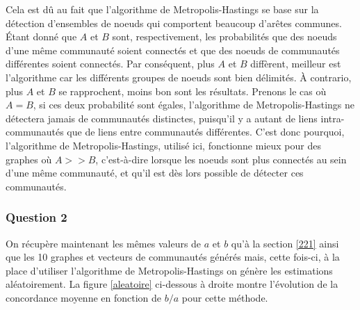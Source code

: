 \documentclass[a4paper, 11pt]{article}
\begin{document}
Cela est dû au fait que l'algorithme de Metropolis-Hastings se base sur la détection d'ensembles de noeuds qui comportent beaucoup d'arêtes communes. Étant donné que $A$ et $B$ sont, respectivement, les probabilités que des noeuds d'une même communauté soient connectés et que des noeuds de communautés différentes soient connectés. Par conséquent, plus $A$ et $B$ diffèrent, meilleur est l'algorithme car les différents groupes de noeuds sont bien délimités. À contrario, plus $A$ et $B$ se rapprochent, moins bon sont les résultats. Prenons le cas où $A=B$, si ces deux probabilité sont égales, l'algorithme de Metropolis-Hastings ne détectera jamais de communautés distinctes, puisqu'il y a autant de liens intra-communautés que de liens entre communautés différentes. C'est donc pourquoi, l'algorithme de Metropolis-Hastings, utilisé ici, fonctionne mieux pour des graphes où $A>>B$, c'est-à-dire lorsque les noeuds sont plus connectés au sein d'une même communauté, et qu'il est dès lors possible de détecter ces communautés.
 
\subsubsection{Question 2}

On récupère maintenant les mêmes valeurs de $a$ et $b$ qu'à la section \ref{221} ainsi que les 10 graphes et vecteurs de communautés générés mais, cette fois-ci, à la place d'utiliser l'algorithme de Metropolis-Hastings on génère les estimations aléatoirement. La figure \ref{aleatoire} ci-dessous à droite montre l'évolution de la concordance moyenne en fonction de $b/a$ pour cette méthode.
\end{document}
